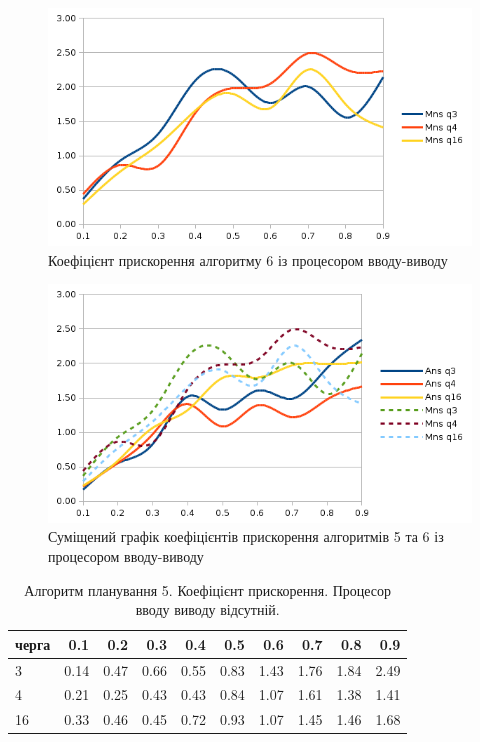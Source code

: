 \begin{figure}[h]
  \begin{center}
    \includegraphics[width=\textwidth]{res/io_mns.png}
  \end{center}
  \caption{Коефіцієнт прискорення алгоритму 6 із процесором вводу-виводу}
\label{fig:io_mns}
\end{figure}

\begin{figure}[h]
  \begin{center}
    \includegraphics[width=\textwidth]{res/io_both.png}
  \end{center}
  \caption{Суміщений графік коефіцієнтів прискорення алгоритмів 5 та 6 із процесором вводу-виводу}
\label{fig:io_both}
\end{figure}


\begin{table}[H]
\caption{Алгоритм планування 5. Коефіцієнт прискорення. Процесор вводу виводу відсутній.}
\label{tab:big_table}
\centering
\begin{tabular}{lrrrrrrrrr}
\toprule
черга &   0.1 &   0.2 &   0.3 &   0.4 &   0.5 &   0.6 &   0.7 &   0.8 &   0.9 \\
\midrule
3 & 0.14 & 0.47 & 0.66 & 0.55 & 0.83 & 1.43 & 1.76 & 1.84 & 2.49 \\
4 & 0.21 & 0.25 & 0.43 & 0.43 & 0.84 & 1.07 & 1.61 & 1.38 & 1.41 \\
16 & 0.33 & 0.46 & 0.45 & 0.72 & 0.93 & 1.07 & 1.45 & 1.46 & 1.68 \\
\bottomrule
\end{tabular}
\end{table}

